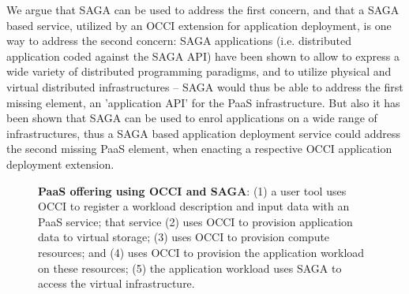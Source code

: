 \documentclass[10pt,conference,final,letterpaper,twoside,twocolumn,]{IEEEtran}
\newcommand{\B}[1]{\textbf{#1}}
\begin{document}
 We argue that SAGA can be used to address the first concern, and that
 a SAGA based service, utilized by an OCCI extension for application
 deployment, is one way to address the second concern: SAGA
 applications (i.e. distributed application coded against the SAGA
 API) have been shown to allow to express a wide variety of
 distributed programming paradigms, and to utilize physical and
 virtual distributed infrastructures -- SAGA would thus be able to
 address the first missing element, an 'application API' for the PaaS
 infrastructure.  But also it has been shown that SAGA can be used to
 enrol applications on a wide range of infrastructures, thus a SAGA
 based application deployment service could address the second missing
 PaaS element, when enacting a respective OCCI application deployment
 extension.

 \begin{figure}[htb]
  \caption{\footnotesize\label{fig:arch3} \B{PaaS offering using 
      OCCI and SAGA}: 
      (1) a user tool uses OCCI to register a workload 
          description and input data with an PaaS service; 
      that service 
      (2) uses OCCI to provision application data to virtual storage; 
      (3) uses OCCI to provision compute resources; and
      (4) uses OCCI to provision the application workload on these resources; 
      (5) the application workload uses SAGA to access the virtual
          infrastructure.}
 \end{figure}
\end{document}
